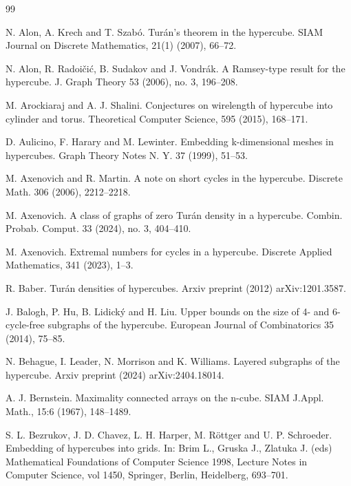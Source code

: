 \documentclass[11pt, a4paper]{article}
\begin{document}
\begin{thebibliography}{99}







N. Alon, A. Krech and T. Szab\'o.
\newblock Tur\'an's theorem in the hypercube.
SIAM Journal on Discrete Mathematics, 21(1) (2007), 66--72.



 N. Alon,  R. Radoi\v{c}i\'c,  B. Sudakov and  J.  Vondr\'ak.
A Ramsey-type result for the hypercube.
J. Graph Theory 53 (2006), no. 3, 196--208.


  M. Arockiaraj and A. J. Shalini. Conjectures on wirelength of hypercube into cylinder and torus. Theoretical Computer Science, 595 (2015), 168--171.

 D. Aulicino, F.  Harary and  M. Lewinter.  Embedding k-dimensional meshes in hypercubes. Graph Theory Notes N. Y. 37 (1999), 51--53.

 M. Axenovich and R. Martin.
\newblock  A note on short cycles in the hypercube.
Discrete Math. 306 (2006), 2212--2218. 

 M. Axenovich.
\newblock A class of graphs of zero Tur\'an density in a hypercube.
Combin. Probab. Comput. 33 (2024), no. 3, 404--410.

 M. Axenovich.
\newblock Extremal numbers for cycles in a hypercube.
Discrete Applied Mathematics, 341 (2023), 1--3.




R. Baber.
\newblock Tur\'an densities of hypercubes.
Arxiv preprint (2012) arXiv:1201.3587.

J. Balogh, P. Hu, B. Lidick\'y and H. Liu.
\newblock Upper bounds on the size of 4- and 6-cycle-free subgraphs of the hypercube.
European Journal of Combinatorics 35 (2014), 75--85.

  N. Behague, I. Leader, N. Morrison and  K. Williams. 
\newblock Layered subgraphs of the hypercube.
Arxiv preprint (2024) arXiv:2404.18014.

  A. J. Bernstein.  Maximality connected arrays on the n-cube. SIAM J.Appl. Math., 15:6 (1967),
148--1489.

  S. L. Bezrukov, J. D. Chavez, L. H. Harper, M. R\"ottger and U. P. Schroeder. Embedding of hypercubes into grids. In: Brim L., Gruska J., Zlatuka J. (eds) Mathematical Foundations of Computer Science 1998, Lecture Notes in Computer Science, vol 1450, Springer, Berlin, Heidelberg, 693--701.



\end{thebibliography}
\end{document}
